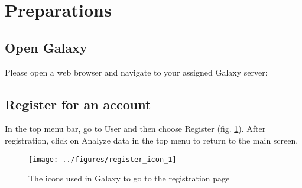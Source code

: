 
\section*{Preparations}
\subsection*{Open Galaxy}
Please open a web browser and navigate to your assigned Galaxy server:

\servers

\subsection*{Register for an account}
In the top menu bar, go to User and then choose Register (fig. \ref{fig:registration}). After registration, click on Analyze data in the top menu to return to the main screen.

\begin{figure}
 \center
  \texttt{[image: ../figures/register\_icon\_1]}
  \caption{\small{ The icons used in Galaxy to go to the registration page }}
  \label{fig:registration}
\end{figure}